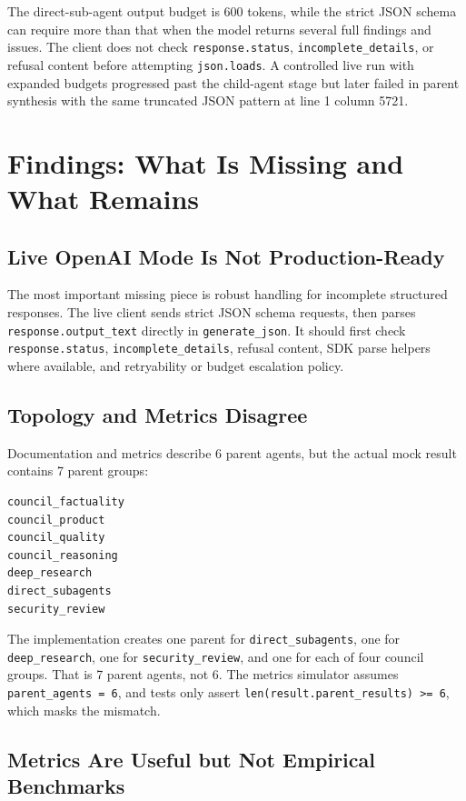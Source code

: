 \documentclass[11pt]{article}
\begin{document}
The direct-sub-agent output budget is 600 tokens, while the strict JSON schema can require more than that when the model returns several full findings and issues. The client does not check \texttt{response.status}, \texttt{incomplete\_details}, or refusal content before attempting \texttt{json.loads}. A controlled live run with expanded budgets progressed past the child-agent stage but later failed in parent synthesis with the same truncated JSON pattern at line 1 column 5721.

\section{Findings: What Is Missing and What Remains}

\subsection{Live OpenAI Mode Is Not Production-Ready}

The most important missing piece is robust handling for incomplete structured responses. The live client sends strict JSON schema requests, then parses \texttt{response.output\_text} directly in \texttt{generate\_json}. It should first check \texttt{response.status}, \texttt{incomplete\_details}, refusal content, SDK parse helpers where available, and retryability or budget escalation policy.

\subsection{Topology and Metrics Disagree}

Documentation and metrics describe 6 parent agents, but the actual mock result contains 7 parent groups:

\begin{verbatim}
council_factuality
council_product
council_quality
council_reasoning
deep_research
direct_subagents
security_review
\end{verbatim}

The implementation creates one parent for \texttt{direct\_subagents}, one for \texttt{deep\_research}, one for \texttt{security\_review}, and one for each of four council groups. That is 7 parent agents, not 6. The metrics simulator assumes \texttt{parent\_agents = 6}, and tests only assert \texttt{len(result.parent\_results) >= 6}, which masks the mismatch.

\subsection{Metrics Are Useful but Not Empirical Benchmarks}
\end{document}
